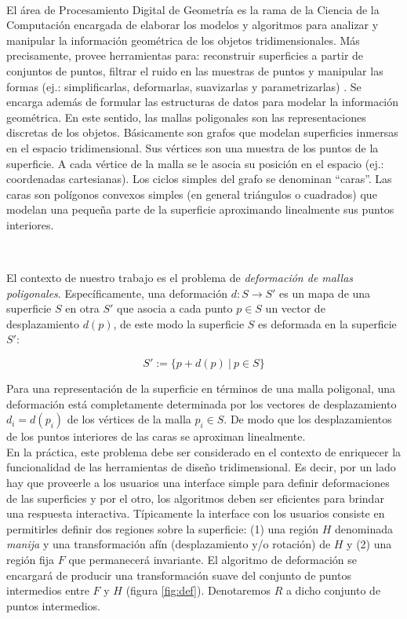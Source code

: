 \documentclass{article}
\begin{document}
\

El área de Procesamiento Digital de Geometría es la rama de la Ciencia 
de la Computación encargada de elaborar los modelos y algoritmos para 
analizar y manipular la información geométrica de los objetos 
tridimensionales. Más precisamente, provee herramientas para: reconstruir 
superficies a partir de conjuntos de puntos, filtrar el ruido en las 
muestras de puntos y manipular las formas (ej.: simplificarlas, deformarlas,
 suavizarlas y parametrizarlas) \cite{BKPAL:2010}. Se encarga además de 
 formular las estructuras de datos para modelar la información geométrica. 
 En este sentido, las mallas poligonales son las representaciones discretas 
 de los  objetos. Básicamente son grafos \cite{Harari:1969} que modelan 
 superficies inmersas en el espacio tridimensional. Sus vértices son  
 una muestra de los puntos de la superficie. A cada vértice de la 
 malla se le asocia su posición en el espacio (ej.: coordenadas cartesianas). 
 Los ciclos simples del grafo se denominan “caras”. Las caras son polígonos 
 convexos simples (en general triángulos o cuadrados) que modelan una pequeña 
 parte de la superficie aproximando linealmente sus puntos interiores.

\

El contexto de nuestro trabajo es el problema de \emph{deformación de mallas 
poligonales}. Específicamente, una deformación $d: S \rightarrow S'$ es un 
mapa de una superficie $S$ en otra $S'$ que asocia a cada punto $p \in S$ 
un vector de desplazamiento $d(p)$, de este modo la superficie $S$ es 
deformada en la superficie $S'$:

$$S' := \{p + d(p) \ | \ p \in S\}$$

Para una representación de la superficie en términos de una malla poligonal, 
una deformación está completamente determinada por los vectores de desplazamiento 
$d_i = d(p_i)$ de los vértices de la malla $p_i \in S$. De modo que los 
desplazamientos de los puntos interiores de las caras se aproximan linealmente. \\
En la práctica, este problema debe ser considerado en el contexto de enriquecer 
la funcionalidad de las herramientas de diseño tridimensional. Es decir, por 
un lado hay que proveerle a los usuarios una interface simple para definir 
deformaciones de las superficies y por el otro, los algoritmos deben ser eficientes 
para brindar una respuesta interactiva. Típicamente la interface con los 
usuarios consiste en permitirles definir dos regiones sobre la superficie: 
(1) una región $H$ denominada \emph{manija} y una transformación afín (desplazamiento 
y/o rotación) de $H$ y (2) una región fija $F$ que permanecerá invariante. 
El algoritmo de deformación se encargará de producir una transformación 
suave del conjunto de puntos intermedios entre $F$ y $H$ (figura \ref{fig:def}). 
Denotaremos $R$ a dicho conjunto de puntos intermedios.
\end{document}
